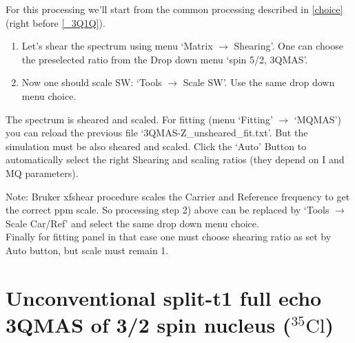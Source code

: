 \documentclass[11pt,a4paper]{article}
\begin{document}
For this processing we'll start from the common processing described in \ref{choice} (right before \ref{_3Q1Q}).

\begin{enumerate}
  \item Let's shear the spectrum using menu `Matrix $\longrightarrow$ Shearing'. One can choose the preselected ratio
from the Drop down menu `spin 5/2, 3QMAS'.
  \item Now one should scale SW: `Tools $\longrightarrow$ Scale SW'. Use the same drop down menu choice.
\end{enumerate}

The spectrum is sheared and scaled. For fitting (menu `Fitting' $\longrightarrow$ `MQMAS') you can reload the previous file
`3QMAS-Z\_unsheared\_fit.txt'. But the simulation must be also sheared and scaled. Click the `Auto' Button to automatically
select the right Shearing and scaling ratios (they depend on I and MQ parameters).

Note: Bruker xfshear procedure scales the Carrier and Reference frequency to get the correct ppm scale. So processing step 2) above can
be replaced by `Tools $\longrightarrow$ Scale Car/Ref' and select the same drop down menu choice.\\
Finally for fitting panel in that case one must choose shearing ratio as set by Auto button, but scale must remain 1.

\section{Unconventional split-t1 full echo 3QMAS of 3/2 spin nucleus (${}^{35}\text{Cl}$)}
\end{document}
